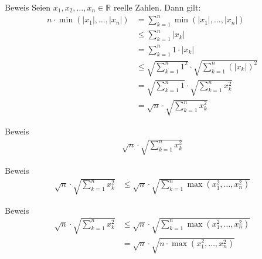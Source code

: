 \documentclass[10pt]{beamer}
\def\bR{\mathbb{R}}
\begin{document}
\begin{frame}{Beweis}
    Seien \( x_{1}, x_{2}, \ldots, x_{n} \in \bR \) reelle Zahlen. Dann gilt:
    \begin{align*}
        n \cdot \min\left( \left\vert x_{1} \right\vert, \ldots, \left\vert x_{n} \right\vert \right)
        & = \sum_{k = 1}^{n} \min\left( \left\vert x_{1} \right\vert, \ldots, \left\vert x_{n} \right\vert \right) \\
        & \leq \sum_{k = 1}^{n} \left\vert x_{k} \right\vert \\
        & = \sum_{k = 1}^{n} 1 \cdot \left\vert x_{k} \right\vert \\
        & \leq \sqrt{\sum_{k = 1}^{n} 1^{2}} \cdot \sqrt{\sum_{k = 1}^{n} \left( \left\vert x_{k} \right\vert \right)^{2}} \\
        & = \sqrt{\sum_{k = 1}^{n} 1 } \cdot \sqrt{\sum_{k = 1}^{n} x_{k}^{2}} \\
        & = \sqrt{n} \cdot \sqrt{\sum_{k = 1}^{n} x_{k}^{2}}
    \end{align*}
\end{frame}



\begin{frame}{Beweis}
    \begin{align*}
        \sqrt{n} \cdot \sqrt{\sum_{k = 1}^{n} x_{k}^{2}}
    \end{align*}
\end{frame}



\begin{frame}{Beweis}
    \begin{align*}
        \sqrt{n} \cdot \sqrt{\sum_{k = 1}^{n} x_{k}^{2}} 
        & \leq \sqrt{n} \cdot \sqrt{\sum_{k = 1}^{n} \max\left( x_{1}^{2}, \ldots, x_{n}^{2} \right)} 
    \end{align*}
\end{frame}



\begin{frame}{Beweis}
    \begin{align*}
        \sqrt{n} \cdot \sqrt{\sum_{k = 1}^{n} x_{k}^{2}} 
        & \leq \sqrt{n} \cdot \sqrt{\sum_{k = 1}^{n} \max\left( x_{1}^{2}, \ldots, x_{n}^{2} \right)} \\
        & = \sqrt{n} \cdot \sqrt{n \cdot \max\left( x_{1}^{2}, \ldots, x_{n}^{2} \right)}
    \end{align*}
\end{frame}
\end{document}
